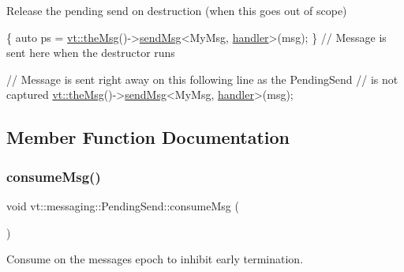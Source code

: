 Release the pending send on destruction (when this goes out of scope) 


\begin{DoxyCode}
\{
  \textcolor{keyword}{auto} ps = \hyperlink{namespacevt_aeafd31f866aeb4dc6fc2f6ee97136350}{vt::theMsg}()->\hyperlink{group__preregister_gaebfcd932babb3be0ea8d481f655a2835}{sendMsg}<MyMsg, \hyperlink{namespacevt_1_1config_a6bd1d6215bda0d8ca02811798399f689a82a0081a94d5c5dfd18b0b3f7eca64b7}{handler}>(msg);
\} \textcolor{comment}{// Message is sent here when the destructor runs}

\textcolor{comment}{// Message is sent right away on this following line as the PendingSend}
\textcolor{comment}{// is not captured}
\hyperlink{namespacevt_aeafd31f866aeb4dc6fc2f6ee97136350}{vt::theMsg}()->\hyperlink{group__preregister_gaebfcd932babb3be0ea8d481f655a2835}{sendMsg}<MyMsg, \hyperlink{namespacevt_1_1config_a6bd1d6215bda0d8ca02811798399f689a82a0081a94d5c5dfd18b0b3f7eca64b7}{handler}>(msg);
\end{DoxyCode}
 

\subsection{Member Function Documentation}
\mbox{\label{structvt_1_1messaging_1_1_pending_send_a0f249a127a798ba0823fae82c925ed3b}} 
\subsubsection{\texorpdfstring{consume\+Msg()}{consumeMsg()}}
{\footnotesize\ttfamily void vt\+::messaging\+::\+Pending\+Send\+::consume\+Msg (\begin{DoxyParamCaption}{ }\end{DoxyParamCaption})}



Consume on the messages epoch to inhibit early termination. 

\mbox{\label{structvt_1_1messaging_1_1_pending_send_a6e6d77bd24d90496826371b900d1979b}} 
